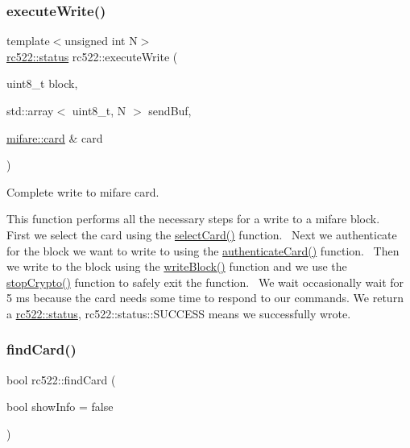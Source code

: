 \subsubsection{\texorpdfstring{execute\+Write()}{executeWrite()}}
{\footnotesize\ttfamily template$<$unsigned int N$>$ \\
\hyperlink{classspiReader_a4bcf984823c38cf4841ebf619e788790}{rc522\+::status} rc522\+::execute\+Write (\begin{DoxyParamCaption}\item[{uint8\+\_\+t}]{block,  }\item[{std\+::array$<$ uint8\+\_\+t, N $>$}]{send\+Buf,  }\item[{\hyperlink{classmifare_1_1card}{mifare\+::card} \&}]{card }\end{DoxyParamCaption})\hspace{0.3cm}{\ttfamily [inline]}}



Complete write to mifare card. 

This function performs all the necessary steps for a write to a mifare block.~\newline
First we select the card using the \hyperlink{classrc522_a5016ad241df63301c261709debcb274b}{select\+Card()} function.~\newline
Next we authenticate for the block we want to write to using the \hyperlink{classrc522_a9cba68c4fff6e1acf8bf9b2601197d96}{authenticate\+Card()} function.~\newline
Then we write to the block using the \hyperlink{classrc522_ae660e16f131e5a28a4412b26d1f016a0}{write\+Block()} function and we use the \hyperlink{classrc522_a0f15a1c190dcde40f314ff4f6ffb65e4}{stop\+Crypto()} function to safely exit the function.~\newline
We wait occasionally wait for 5 ms because the card needs some time to respond to our commands. We return a \hyperlink{classspiReader_a4bcf984823c38cf4841ebf619e788790}{rc522\+::status}, rc522\+::status\+::\+S\+U\+C\+C\+E\+SS means we successfully wrote. \mbox{\label{classrc522_a3183014b1670c6c3cdb47ec857967476}} 
\subsubsection{\texorpdfstring{find\+Card()}{findCard()}}
{\footnotesize\ttfamily bool rc522\+::find\+Card (\begin{DoxyParamCaption}\item[{bool}]{show\+Info = {\ttfamily false} }\end{DoxyParamCaption})}



